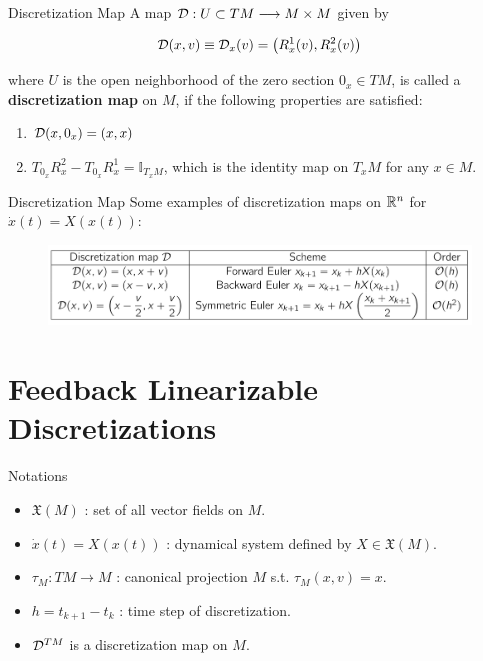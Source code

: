 \documentclass{beamer}
\begin{document}
\begin{frame}{Discretization Map}
  A map $\D : U \subset TM \longrightarrow M \times M$ given by 

\[
  \D (x,v) \equiv \D_x(v) = \left( R^1_x(v), R^2_x(v) \right)
\]

where $U$ is the open neighborhood of the zero section $0_x \in TM$, is called a \textbf{discretization map} on $M$, if the following properties are satisfied:

\begin{enumerate}
  \item $\D(x,0_x) = (x,x)$ 
  \item $T_{0_x}R_x^2 - T_{0_x}R_x^1 = \mathbb{I}_{T_x M}$, which is the identity map on $T_x M$ for any $x \in M$.
\end{enumerate}
  
\end{frame}

\begin{frame}{Discretization Map}
  Some examples of discretization maps on $\R[n]$ for $\dot{x}(t) = X(x(t))$:

  \begin{figure}
    \centering
    \includegraphics[width=\textwidth]{../Figures/discretizations.png}
  \end{figure}
\end{frame}

\section{Feedback Linearizable Discretizations}

\begin{frame}{Notations}

  \begin{itemize}
    \item $\mathfrak{X}(M)$ : set of all vector fields on $M$. 
    \item $\dot{x}(t) = X(x(t))$ : dynamical system defined by $X \in \mathfrak{X}(M)$.
    \item $\tau_M : TM \longrightarrow M$ : canonical projection $M$ s.t. $\tau_M(x,v) = x$.
    \item $h = t_{k+1} - t_k$ : time step of discretization.
    \item $\D^{TM}$ is a discretization map on $M$.
  \end{itemize}
  
\end{frame}
\end{document}
